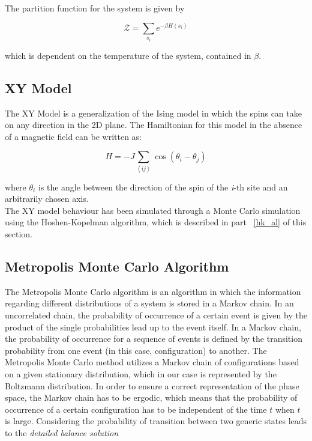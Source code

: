 \documentclass[twoside]{article}
\def\mean#1{\left< #1 \right>}
\begin{document}
\begin{multicols}{2}
The partition function for the system is given by 

\begin{equation}
\mathcal{Z} = \sum_{s_i} e^{-\beta H\left(s_i\right)}
\end{equation}

which is dependent on the temperature of the system, contained in $\beta$. 

\subsection{XY Model}
The XY Model is a generalization of the Ising model in which the spins can take on any direction in the 2D plane. The Hamiltonian for this model in the absence of a magnetic field can be written as:

\begin{equation}
H = -J \sum_{\mean{ij}} \cos(\theta_i - \theta_j)
\end{equation}

where $\theta_i$ is the angle between the direction of the spin of the \emph{i}-th site and an arbitrarily chosen axis. \\
The XY model behaviour has been simulated through a Monte Carlo simulation using the Hoshen-Kopelman algorithm, which is described in part ~\ref{hk_al} of this section.

\subsection{Metropolis Monte Carlo Algorithm}
The Metropolis Monte Carlo algorithm is an algorithm in which the information regarding different distributions of a system is stored in a Markov chain. 
In an uncorrelated chain, the probability of occurrence of a certain event is given by the product of the single probabilities lead up to the event itself. In a Markov chain, the probability of occurrence for a sequence of events is defined by the transition probability from one event (in this case, configuration) to another.
The Metropolis Monte Carlo method utilizes a Markov chain of configurations based on a given stationary distribution, which in our case is represented by the Boltzmann distribution. In order to ensure a correct representation of the phase space, the Markov chain has to be ergodic, which means that the probability of occurrence of a certain configuration has to be independent of the time $t$ when $t$ is large. 
Considering the probability of transition between two generic states leads to the \emph{detailed balance solution}


\end{multicols}
\end{document}
